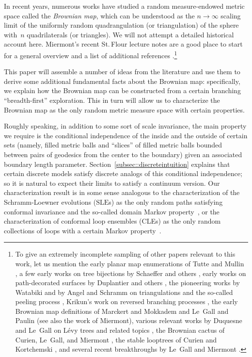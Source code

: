 \documentclass[10pt]{amsart}
\theoremstyle{plain}
\numberwithin{theorem}{section}
\theoremstyle{definition}
\newcommand{\SLE}{\mathrm{SLE}}
\begin{document}
In recent years, numerous works have studied a random measure-endowed metric space called the \emph{Brownian map}, which can be understood as the $n \to \infty$ scaling limit of the uniformly random quadrangulation (or triangulation) of the sphere with~$n$ quadrilaterals (or triangles). We will not attempt a detailed historical account here. Miermont's recent St.\,Flour lecture notes are a good place to start for a general overview and a list of additional references \cite{miermontstflour}.\footnote{To give an extremely incomplete sampling of other papers relevant to this work, let us mention the early planar map enumerations of Tutte and Mullin \cite{tutte1962census,mullintrees,MR0218276}, a few early works on tree bijections by Schaeffer and others \cite{cori1981planar, jacquardschaeffer, schaeffermaps, bousquetmelouschaeffer, chassaingschaeffer}, early works on path-decorated surfaces by Duplantier and others \cite{dk1998rwks, ds1989fk, dup1998rw_qg}, the pioneering works by Watabiki and by Angel and Schramm on triangulations and the so-called peeling process \cite{watabikipeeling, angelUIPTpercolation, angelschrammUIPT}, Krikun's work on reversed branching processes \cite{krikun2005uniform}, the early Brownian map definitions of Marckert and Mokkadem \cite{marckert2006limit} and Le~Gall and Paulin \cite{le2008scaling} (see also the work \cite{MR2399286} of Miermont), various relevant works by Duquesne and Le~Gall on Lévy trees and related topics \cite{dlg2002trees_levy, duquesnelegall2005levytrees,duquesnelegallhausdorff, duquesnelegallrerooting}, the Brownian cactus of Curien, Le~Gall, and Miermont \cite{browniancactus}, the stable looptrees of Curien and Kortchemski \cite{ck2013looptrees}, and several recent breakthroughs by Le~Gall and Miermont \cite{legallgeodesics, legalluniqueanduniversal, miermontlimit, legalluniversallimit}.}

This paper will assemble a number of ideas from the literature and use them to derive some additional fundamental facts about the Brownian map: specifically, we explain how the Brownian map can be constructed from a certain branching ``breadth-first'' exploration. This in turn will allow us to characterize the Brownian map as the only random metric measure space with certain properties.\enlargethispage{\baselineskip}%

Roughly speaking, in addition to some sort of scale invariance, the main property we require is the conditional independence of the inside and the outside of certain sets (namely, filled metric balls and ``slices'' of filled metric balls bounded between pairs of geodesics from the center to the boundary) given an associated boundary length parameter. Section~\ref{subsec::discreteintuition} explains that certain discrete models satisfy discrete analogs of this conditional independence; so it is natural to expect their limits to satisfy a continuum version. Our characterization result is in some sense analogous to the characterization of the Schramm-Loewner evolutions ($\SLE$s) as the only random paths satisfying conformal invariance and the so-called domain Markov property~\cite{S0}, or the characterization of conformal loop ensembles (CLEs) as the only random collections of loops with a certain Markov property~\cite{MR2979861}.
\end{document}
